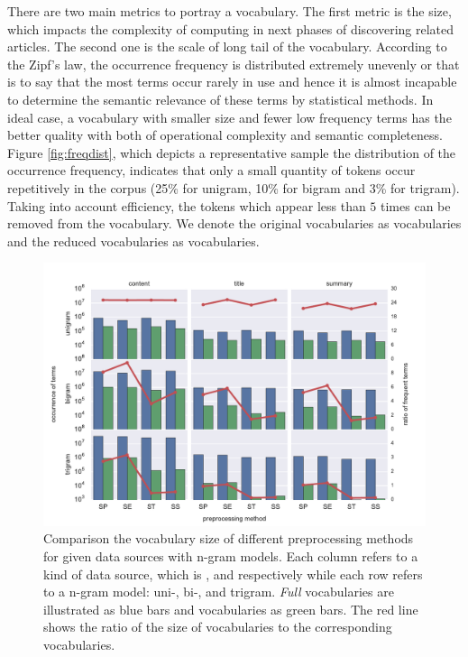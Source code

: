 There are two main metrics to portray a vocabulary. The first metric is the size, which impacts the complexity of computing in next phases of discovering related articles. The second one is the scale of long tail of the vocabulary. According to the Zipf's law, the occurrence frequency is distributed extremely unevenly or that is to say that the most terms occur rarely in use and hence it is almost incapable to determine the semantic relevance of these terms by statistical methods. In ideal case, a vocabulary with smaller size and fewer low frequency terms has the better quality with both of operational complexity and semantic completeness. Figure \ref{fig:freqdist}, which depicts a representative sample the distribution of the occurrence frequency, indicates that only a small quantity of tokens occur repetitively in the corpus (25\% for unigram, 10\% for bigram and 3\% for trigram). Taking into account efficiency, the tokens which appear less than $5$ times can be removed from the vocabulary. We denote the original vocabularies as \ifull{} vocabularies and the reduced vocabularies as \icommon{} vocabularies. 

\begin{figure}[!htb]
    \centering
    \includegraphics[width=\textwidth]{fig/vocab_size}
    \caption{Comparison the vocabulary size of different preprocessing methods for given data sources with n-gram models. Each column refers to a kind of data source, which is \icontent{}, \ititle{} and \isummary{} respectively while each row refers to a n-gram model: uni-, bi-, and trigram. \textit{Full} vocabularies are illustrated as blue bars and \icommon{} vocabularies as green bars. The red line shows the ratio of the size of \icommon{} vocabularies to the corresponding \ifull{} vocabularies. }
    \label{fig:vocab_size}
\end{figure}



